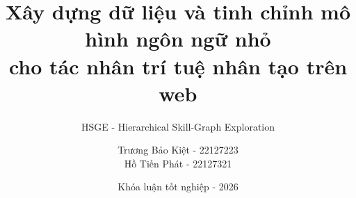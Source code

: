 \title[HSGE]{Xây dựng dữ liệu và tinh chỉnh mô hình ngôn ngữ nhỏ\\cho tác nhân trí tuệ nhân tạo trên web}
\subtitle{HSGE - Hierarchical Skill-Graph Exploration}

\author[Bảo Kiệt - Tiến Phát]{
  \texorpdfstring{Trương Bảo Kiệt - 22127223 \\ Hồ Tiến Phát - 22127321}{Trương Bảo Kiệt, Hồ Tiến Phát}
}


\date{Khóa luận tốt nghiệp - 2026}

